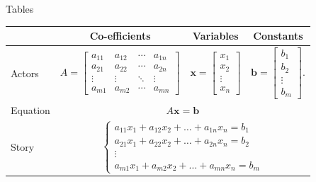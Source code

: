 \documentclass[11pt, aspectratio=169]{beamer}
\begin{document}
\begin{frame}{Tables}%
    \scriptsize
    \begin{table}
    \centering
    \renewcommand{\arraystretch}{0.8}
        \begin{tabular}{lccc}
            \toprule
            & Co-efficients & Variables & Constants\\
            \midrule
            Actors & $\displaystyle A={\begin{bmatrix}a_{11}&a_{12}&\cdots &a_{1n}\\a_{21}&a_{22}&\cdots &a_{2n}\\\vdots &\vdots &\ddots &\vdots \\a_{m1}&a_{m2}&\cdots &a_{mn}\end{bmatrix}}$ & $\mathbf {x} ={\begin{bmatrix}x_{1}\\x_{2}\\\vdots \\x_{n}\end{bmatrix}}$ & $\mathbf {b} ={\begin{bmatrix}b_{1}\\b_{2}\\\vdots \\b_{m}\end{bmatrix}}.$\\
            \midrule
            Equation & \multicolumn{3}{c}{$A\mathbf{x} = \mathbf{b}$}\\
            \midrule
            Story & \multicolumn{3}{c}{${\displaystyle {\begin{cases}a_{11}x_{1}+a_{12}x_{2}+\dots +a_{1n}x_{n}=b_{1}\\a_{21}x_{1}+a_{22}x_{2}+\dots +a_{2n}x_{n}=b_{2}\\\vdots \\a_{m1}x_{1}+a_{m2}x_{2}+\dots +a_{mn}x_{n}=b_{m}\end{cases}}}$}\\
            \bottomrule
        \end{tabular}
    \end{table}
\end{frame}
\end{document}
